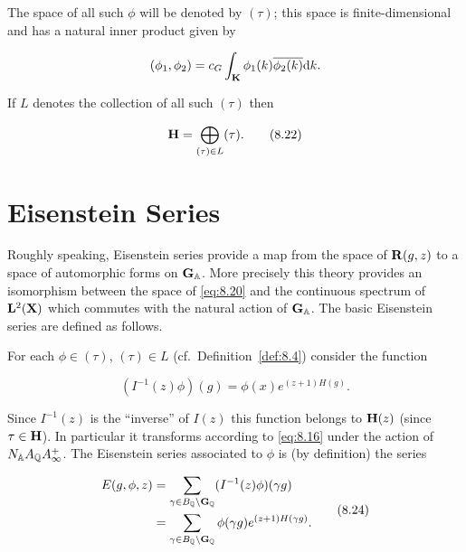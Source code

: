 The space of all such $\phi$ will be denoted by $(\tau)$; this space is finite-dimensional and has a natural inner product given by

\[
(\phi_{1}, \phi_{2}) = c_{G}\int_{\mathbf{K}} \phi_{1}(k)\overline{\phi_{2}(k)} \mathrm{d} k.
\]

If $L$ denotes the collection of all such $(\tau)$ then

\begin{equation}\label{eq:8.22}
\mathbf{H} = \bigoplus_{(\tau) \in L} (\tau).\tag{8.22}
\end{equation}

\section{Eisenstein Series}\label{sec:8c}

Roughly speaking, Eisenstein series provide a map from the space of $\mathbf{R}(g,z)$ to a space of automorphic forms on $\mathbf{G}_{\mathbb{A}}$. More precisely this theory provides an isomorphism between the space of \eqref{eq:8.20} and the continuous spectrum of $\mathbf{L}^{2}(\mathbf{X})$ which commutes with the natural action of $\mathbf{G}_{\mathbb{A}}$. The basic Eisenstein series are defined as follows.

For each $\phi \in (\tau)$, $(\tau) \in L$ (cf.\ Definition~\ref{def:8.4}) consider the function

\begin{equation}\label{eq:8.23}
(I^{-1}(z)\phi)(g) = \phi(x)e^{(z+1)H(g)}.\tag{8.23}
\end{equation}

Since $I^{-1}(z)$ is the ``inverse'' of $I(z)$ this function belongs to $\mathbf{H}(z)$ (since $\tau \in \mathbf{H}$). In particular it transforms according to \eqref{eq:8.16} under the action of $N_{\mathbb{A}}A_{\mathbb{Q}}A_{\infty}^{+}$. The Eisenstein series associated to $\phi$ is (by definition) the series

\begin{equation}\label{eq:8.24}
\begin{aligned}
E(g,\phi,z) &= \sum_{\gamma \in B_{\mathbb{Q}}\backslash\mathbf{G}_{\mathbb{Q}}} (I^{-1}(z)\phi)(\gamma g)\\
&= \sum_{\gamma \in B_{\mathbb{Q}}\backslash\mathbf{G}_{\mathbb{Q}}} \phi(\gamma g)e^{(z+1)H(\gamma g)}.
\end{aligned}\tag{8.24}
\end{equation}

